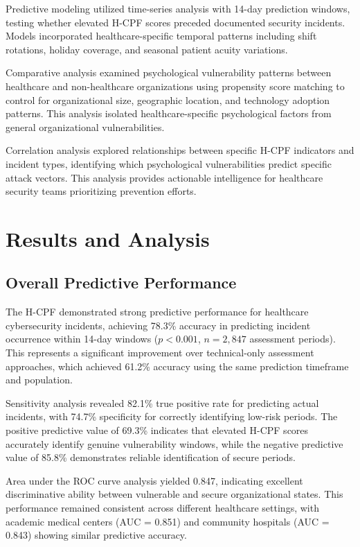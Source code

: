 \documentclass[10pt, twocolumn]{article}
\begin{document}
Predictive modeling utilized time-series analysis with 14-day prediction windows, testing whether elevated H-CPF scores preceded documented security incidents. Models incorporated healthcare-specific temporal patterns including shift rotations, holiday coverage, and seasonal patient acuity variations.

Comparative analysis examined psychological vulnerability patterns between healthcare and non-healthcare organizations using propensity score matching to control for organizational size, geographic location, and technology adoption patterns. This analysis isolated healthcare-specific psychological factors from general organizational vulnerabilities.

Correlation analysis explored relationships between specific H-CPF indicators and incident types, identifying which psychological vulnerabilities predict specific attack vectors. This analysis provides actionable intelligence for healthcare security teams prioritizing prevention efforts.

\section{Results and Analysis}

\subsection{Overall Predictive Performance}

The H-CPF demonstrated strong predictive performance for healthcare cybersecurity incidents, achieving 78.3\% accuracy in predicting incident occurrence within 14-day windows ($p < 0.001$, $n = 2,847$ assessment periods). This represents a significant improvement over technical-only assessment approaches, which achieved 61.2\% accuracy using the same prediction timeframe and population.

Sensitivity analysis revealed 82.1\% true positive rate for predicting actual incidents, with 74.7\% specificity for correctly identifying low-risk periods. The positive predictive value of 69.3\% indicates that elevated H-CPF scores accurately identify genuine vulnerability windows, while the negative predictive value of 85.8\% demonstrates reliable identification of secure periods.

Area under the ROC curve analysis yielded 0.847, indicating excellent discriminative ability between vulnerable and secure organizational states. This performance remained consistent across different healthcare settings, with academic medical centers (AUC = 0.851) and community hospitals (AUC = 0.843) showing similar predictive accuracy.
\end{document}
